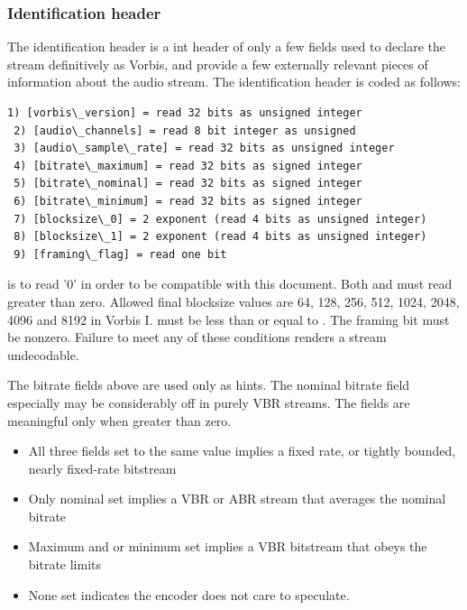 \subsubsection{Identification header}

The identification header is a int header of only a few fields used
to declare the stream definitively as Vorbis, and provide a few externally
relevant pieces of information about the audio stream. The
identification header is coded as follows:

\begin{Verbatim}[commandchars=\\\{\}]
 1) [vorbis\_version] = read 32 bits as unsigned integer
 2) [audio\_channels] = read 8 bit integer as unsigned
 3) [audio\_sample\_rate] = read 32 bits as unsigned integer
 4) [bitrate\_maximum] = read 32 bits as signed integer
 5) [bitrate\_nominal] = read 32 bits as signed integer
 6) [bitrate\_minimum] = read 32 bits as signed integer
 7) [blocksize\_0] = 2 exponent (read 4 bits as unsigned integer)
 8) [blocksize\_1] = 2 exponent (read 4 bits as unsigned integer)
 9) [framing\_flag] = read one bit
\end{Verbatim}

 is to read '0' in order to be compatible
with this document.  Both  and
 must read greater than zero.  Allowed final
blocksize values are 64, 128, 256, 512, 1024, 2048, 4096 and 8192 in
Vorbis I.  \varname{[blocksize\_0]} must be less than or equal to
\varname{[blocksize\_1]}.  The framing bit must be nonzero.  Failure to
meet any of these conditions renders a stream undecodable.

The bitrate fields above are used only as hints. The nominal bitrate
field especially may be considerably off in purely VBR streams.  The
fields are meaningful only when greater than zero.

\begin{itemize}
  \item All three fields set to the same value implies a fixed rate, or tightly bounded, nearly fixed-rate bitstream
  \item Only nominal set implies a VBR or ABR stream that averages the nominal bitrate
  \item Maximum and or minimum set implies a VBR bitstream that obeys the bitrate limits
  \item None set indicates the encoder does not care to speculate.
\end{itemize}




